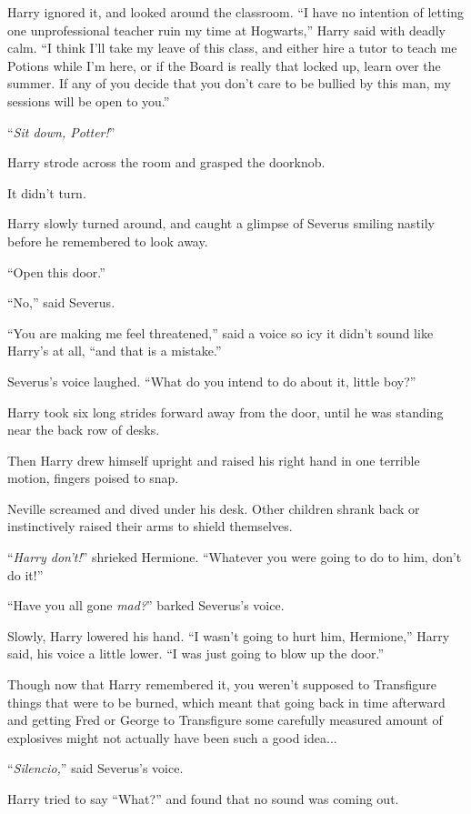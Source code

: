 Harry ignored it, and looked around the classroom. ``I have no intention of letting one unprofessional teacher ruin my time at Hogwarts,'' Harry said with deadly calm. ``I think I'll take my leave of this class, and either hire a tutor to teach me Potions while I'm here, or if the Board is really that locked up, learn over the summer. If any of you decide that you don't care to be bullied by this man, my sessions will be open to you.''

``\emph{Sit down, Potter!}''

Harry strode across the room and grasped the doorknob.

It didn't turn.

Harry slowly turned around, and caught a glimpse of Severus smiling nastily before he remembered to look away.

``Open this door.''

``No,'' said Severus.

``You are making me feel threatened,'' said a voice so icy it didn't sound like Harry's at all, ``and that is a mistake.''

Severus's voice laughed. ``What do you intend to do about it, little boy?''

Harry took six long strides forward away from the door, until he was standing near the back row of desks.

Then Harry drew himself upright and raised his right hand in one terrible motion, fingers poised to snap.

Neville screamed and dived under his desk. Other children shrank back or instinctively raised their arms to shield themselves.

``\emph{Harry don't!}'' shrieked Hermione. ``Whatever you were going to do to him, don't do it!''

``Have you all gone \emph{mad?}'' barked Severus's voice.

Slowly, Harry lowered his hand. ``I wasn't going to hurt him, Hermione,'' Harry said, his voice a little lower. ``I was just going to blow up the door.''

Though now that Harry remembered it, you weren't supposed to Transfigure things that were to be burned, which meant that going back in time afterward and getting Fred or George to Transfigure some carefully measured amount of explosives might not actually have been such a good idea...

``\emph{Silencio,}'' said Severus's voice.

Harry tried to say ``What?'' and found that no sound was coming out.

